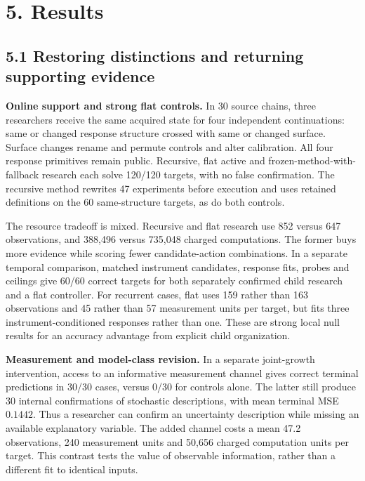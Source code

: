 \documentclass[11pt,a4paper]{article}
\begin{document}
\section*{5. Results}

\subsection*{5.1 Restoring distinctions and returning supporting evidence}

\textbf{Online support and strong flat controls.} In 30 source chains, three researchers receive the same acquired state for four independent continuations: same or changed response structure crossed with same or changed surface. Surface changes rename and permute controls and alter calibration. All four response primitives remain public. Recursive, flat active and frozen-method-with-fallback research each solve 120/120 targets, with no false confirmation. The recursive method rewrites 47 experiments before execution and uses retained definitions on the 60 same-structure targets, as do both controls.


The resource tradeoff is mixed. Recursive and flat research use 852 versus 647 observations, and 388,496 versus 735,048 charged computations. The former buys more evidence while scoring fewer candidate-action combinations. In a separate temporal comparison, matched instrument candidates, response fits, probes and ceilings give 60/60 correct targets for both separately confirmed child research and a flat controller. For recurrent cases, flat uses 159 rather than 163 observations and 45 rather than 57 measurement units per target, but fits three instrument-conditioned responses rather than one. These are strong local null results for an accuracy advantage from explicit child organization.


\textbf{Measurement and model-class revision.} In a separate joint-growth intervention, access to an informative measurement channel gives correct terminal predictions in 30/30 cases, versus 0/30 for controls alone. The latter still produce 30 internal confirmations of stochastic descriptions, with mean terminal MSE \(0.1442\). Thus a researcher can confirm an uncertainty description while missing an available explanatory variable. The added channel costs a mean 47.2 observations, 240 measurement units and 50,656 charged computation units per target. This contrast tests the value of observable information, rather than a different fit to identical inputs.
\end{document}
